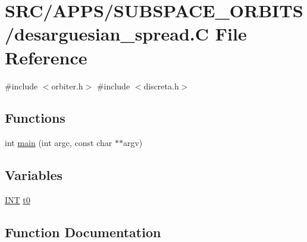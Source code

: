 \hypertarget{_a_p_p_s_2_s_u_b_s_p_a_c_e___o_r_b_i_t_s_2desarguesian__spread_8_c}{}\section{S\+R\+C/\+A\+P\+P\+S/\+S\+U\+B\+S\+P\+A\+C\+E\+\_\+\+O\+R\+B\+I\+T\+S/desarguesian\+\_\+spread.C File Reference}
\label{_a_p_p_s_2_s_u_b_s_p_a_c_e___o_r_b_i_t_s_2desarguesian__spread_8_c}
{\ttfamily \#include $<$orbiter.\+h$>$}\newline
{\ttfamily \#include $<$discreta.\+h$>$}\newline
\subsection*{Functions}
\begin{DoxyCompactItemize}
\item 
int \mbox{\hyperlink{_a_p_p_s_2_s_u_b_s_p_a_c_e___o_r_b_i_t_s_2desarguesian__spread_8_c_a217dbf8b442f20279ea00b898af96f52}{main}} (int argc, const char $\ast$$\ast$argv)
\end{DoxyCompactItemize}
\subsection*{Variables}
\begin{DoxyCompactItemize}
\item 
\mbox{\hyperlink{galois_8h_a09fddde158a3a20bd2dcadb609de11dc}{I\+NT}} \mbox{\hyperlink{_a_p_p_s_2_s_u_b_s_p_a_c_e___o_r_b_i_t_s_2desarguesian__spread_8_c_a4268f4fe222ffb119218a0199f5e1904}{t0}}
\end{DoxyCompactItemize}


\subsection{Function Documentation}
\mbox{\label{_a_p_p_s_2_s_u_b_s_p_a_c_e___o_r_b_i_t_s_2desarguesian__spread_8_c_a217dbf8b442f20279ea00b898af96f52}} 
